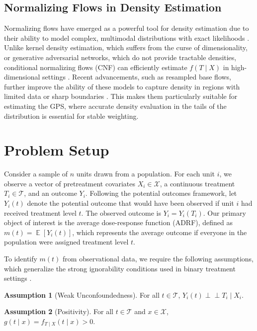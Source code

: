\documentclass[12pt]{article}
\newcommand{\ind}{\perp\!\!\!\perp}
\DeclareMathOperator{\E}{\mathbb{E}}
\theoremstyle{definition}
\newtheorem{assumption}{Assumption}
\begin{document}
\subsection{Normalizing Flows in Density Estimation}

Normalizing flows have emerged as a powerful tool for density estimation due to their ability to model complex, multimodal distributions with exact likelihoods \citet{Kobyzev2021a}. Unlike kernel density estimation, which suffers from the curse of dimensionality, or generative adversarial networks, which do not provide tractable densities, conditional normalizing flows (CNF) can efficiently estimate $f(T \mid X)$ in high-dimensional settings \citet{Winkler2023a}. Recent advancements, such as resampled base flows, further improve the ability of these models to capture density in regions with limited data or sharp boundaries \citet{Stimper2022a}. This makes them particularly suitable for estimating the GPS, where accurate density evaluation in the tails of the distribution is essential for stable weighting.


\section{Problem Setup}

Consider a sample of $n$ units drawn from a population. For each unit $i$, we observe a vector of pretreatment covariates $X_i \in \mathcal{X}$, a continuous treatment $T_i \in \mathcal{T}$, and an outcome $Y_i$. Following the potential outcomes framework, let $Y_i(t)$ denote the potential outcome that would have been observed if unit $i$ had received treatment level $t$. The observed outcome is $Y_i = Y_i(T_i)$. Our primary object of interest is the average dose-response function (ADRF), defined as $m(t) = \E[Y_i(t)]$, which represents the average outcome if everyone in the population were assigned treatment level $t$.

To identify $m(t)$ from observational data, we require the following assumptions, which generalize the strong ignorability conditions used in binary treatment settings \citep{hirano2004propensity}.

\begin{assumption}[Weak Unconfoundedness]
For all $t \in \mathcal{T}$, $Y_i(t) \ind T_i \mid X_i$.
\end{assumption}

\begin{assumption}[Positivity]
For all $t \in \mathcal{T}$ and $x \in \mathcal{X}$, $g(t \mid x) = f_{T \mid X}(t \mid x) > 0$.
\end{assumption}
\end{document}
